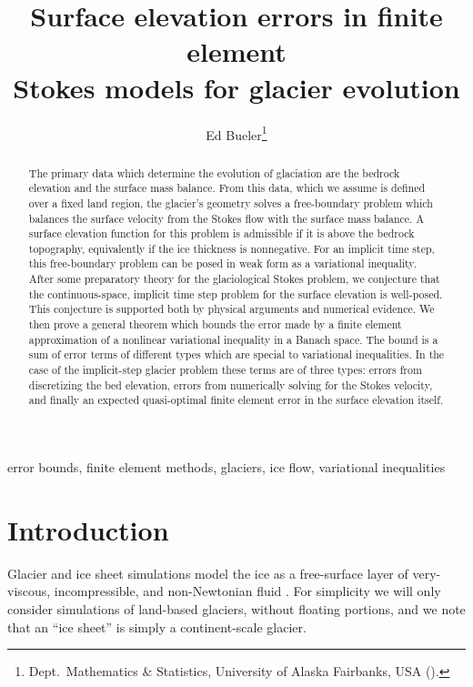 \documentclass[hidelinks,onefignum,onetabnum,final]{siamart220329}  %
\title{Surface elevation errors in finite element \\ Stokes models for glacier evolution}
\author{Ed Bueler\thanks{Dept.~Mathematics \& Statistics, University of Alaska Fairbanks, USA (\email{elbueler@alaska.edu}).}}
\begin{document}
\maketitle

\begin{abstract}
The primary data which determine the evolution of glaciation are the bedrock elevation and the surface mass balance.  From this data, which we assume is defined over a fixed land region, the glacier's geometry solves a free-boundary problem which balances the surface velocity from the Stokes flow with the surface mass balance.  A surface elevation function for this problem is admissible if it is above the bedrock topography, equivalently if the ice thickness is nonnegative.  For an implicit time step, this free-boundary problem can be posed in weak form as a variational inequality.  After some preparatory theory for the glaciological Stokes problem, we conjecture that the continuous-space, implicit time step problem for the surface elevation is well-posed.  This conjecture is supported both by physical arguments and numerical evidence.  We then prove a general theorem which bounds the error made by a finite element approximation of a nonlinear variational inequality in a Banach space.  The bound is a sum of error terms of different types which are special to variational inequalities.  In the case of the implicit-step glacier problem these terms are of three types: errors from discretizing the bed elevation, errors from numerically solving for the Stokes velocity, and finally an expected quasi-optimal finite element error in the surface elevation itself.
\end{abstract}

\begin{keywords}
error bounds, finite element methods, glaciers, ice flow, variational inequalities
\end{keywords}


\section{Introduction} \label{sec:intro}

Glacier and ice sheet simulations model the ice as a free-surface layer of very-viscous, incompressible, and non-Newtonian fluid \cite{GreveBlatter2009,SchoofHewitt2013}.  For simplicity we will only consider simulations of land-based glaciers, without floating portions, and we note that an ``ice sheet'' is simply a continent-scale glacier.
\end{document}
